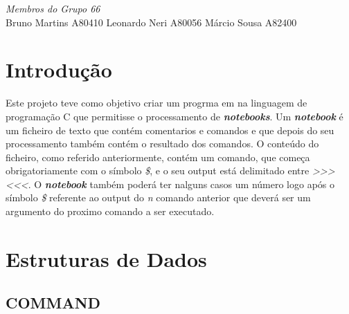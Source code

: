 \begin{titlepage}
\Large \emph{Membros do Grupo 66}\\
Bruno Martins A80410
Leonardo Neri A80056
Márcio Sousa A82400




 

\vfill %

\end{titlepage}

\section{Introdução}
Este projeto teve como objetivo criar um progrma em na linguagem de programação C que permitisse o processamento de \textbf{\textit{notebooks}}. Um \textbf{\textit{notebook}} é um ficheiro de texto que contém comentarios e comandos e que depois do seu processamento também contém o resultado dos comandos.
O conteúdo do ficheiro, como referido anteriormente, contém um comando, que começa obrigatoriamente com o símbolo \textit{\$}, e o seu output está delimitado entre \textit{>>> <<<}. O \textbf{\textit{notebook}} também poderá ter nalguns casos um número logo após o símbolo \textit{\$} referente ao output do \textit{n} comando anterior que deverá ser um argumento do proximo comando a ser executado. 

\section{Estruturas de Dados}



\subsection{COMMAND}

